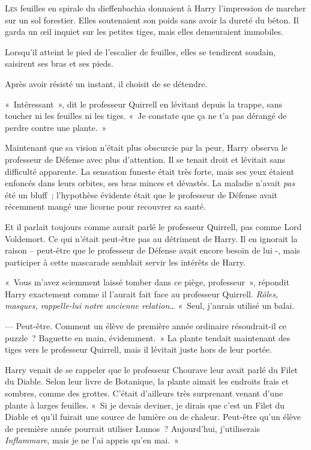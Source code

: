 
\lettrine{L}{es} feuilles en spirale du dieffenbachia donnaient à Harry l'impression de marcher sur un sol forestier.
Elles soutenaient son poids sans avoir la dureté du béton.
Il garda un œil inquiet sur les petites tiges, mais elles demeuraient immobiles.

Lorsqu'il atteint le pied de l'escalier de feuilles, elles se tendirent soudain, saisirent ses bras et ses pieds.

Après avoir résisté un instant, il choisit de se détendre.

«~Intéressant~», dit le professeur Quirrell en lévitant depuis la trappe, sans toucher ni les feuilles ni les tiges.
«~Je constate que ça ne t'a pas dérangé de perdre contre une plante.~»

Maintenant que sa vision n'était plus obscurcie par la peur, Harry observa le professeur de Défense avec plus d'attention.
Il se tenait droit et lévitait sans difficulté apparente.
La sensation funeste était très forte, mais ses yeux étaient enfoncés dans leurs orbites, ses bras minces et dévastés.
La maladie n'avait \emph{pas} été un bluff~; l'hypothèse évidente était que le professeur de Défense avait récemment mangé une licorne pour recouvrer sa santé.

Et il parlait toujours comme aurait parlé le professeur Quirrell, pas comme Lord Voldemort.
Ce qui n'était peut-être pas au détriment de Harry.
Il en ignorait la raison -- peut-être que le professeur de Défense avait encore besoin de lui -, mais participer à cette mascarade semblait servir les intérêts de Harry.

«~Vous m'avez sciemment laissé tomber dans ce piège, professeur~», répondit Harry exactement comme il l'aurait fait face au professeur Quirrell.
\emph{Rôles, masques, rappelle-lui notre ancienne relation…} «~Seul, j'aurais utilisé un balai.

--- Peut-être.
Comment un élève de première année ordinaire résoudrait-il ce puzzle~?
Baguette en main, évidemment.~»
La plante tendait maintenant des tiges vers le professeur Quirrell, mais il lévitait juste hors de leur portée.

Harry venait de se rappeler que le professeur Chourave leur avait parlé du Filet du Diable.
Selon leur livre de Botanique, la plante aimait les endroits frais et sombres, comme des grottes.
C'était d'ailleurs très surprenant venant d'une plante à larges feuilles.
«~Si je devais deviner, je dirais que c'est un Filet du Diable et qu'il fuirait une source de lumière ou de chaleur.
Peut-être qu'un élève de première année pourrait utiliser Lumos~?
Aujourd'hui, j'utiliserais \emph{Inflammare}, mais je ne l'ai appris qu'en mai.~»

